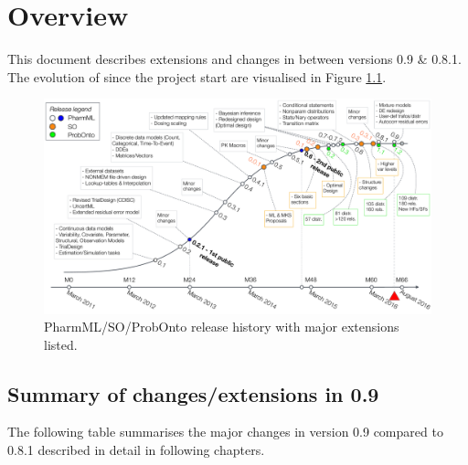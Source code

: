 
\chapter{Overview}

This document describes extensions and changes in \pml between versions 0.9 \& 0.8.1. 
The evolution of \pml since the project start are visualised in Figure \ref{fig:history}.

\begin{figure}[ht!]
\centering
  \includegraphics[width=160mm]{pics/Timeline-v09.pdf}
 \caption{PharmML/SO/ProbOnto release history with major extensions listed.}
 \label{fig:history}
\end{figure}

\section{Summary of changes/extensions in 0.9}
The following table summarises the major changes in version 0.9 compared to 0.8.1
described in detail in following chapters. 
	
